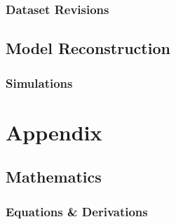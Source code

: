 \documentclass[12pt]{article}
\begin{document}
{\subsubsection*{Dataset Revisions}
\subsection{Model Reconstruction}
\subsubsection*{Simulations}
\newpage
\printbibliography
\newpage
\section{Appendix}
\subsection{Mathematics}
\subsubsection{Equations \& Derivations}
}
\end{document}
